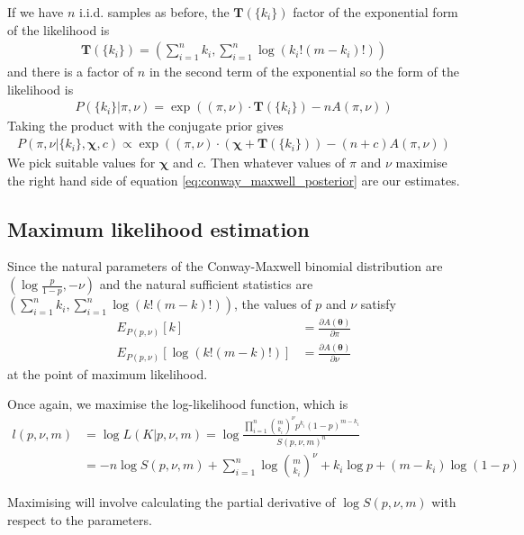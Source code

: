 \documentclass[a4paper,12pt]{article}
\theoremstyle{definition}
\newcommand{\pdiff}[2]{\frac{\partial #1}{\partial #2}} %
\begin{document}
If we have $n$ i.i.d. samples as before, the $\mathbf{T}(\lbrace k_i \rbrace)$ factor of the exponential form of the likelihood is 
\begin{align}
  \mathbf{T}(\lbrace k_i \rbrace) = \left( \sum_{i=1}^n k_i, \sum_{i=1}^n \log (k_i!(m - k_i)!) \right)
\end{align}
and there is a factor of $n$ in the second term of the exponential so the form of the likelihood is
\begin{align}
  P(\lbrace k_i \rbrace | \pi, \nu) = \exp \left( (\pi, \nu) \cdot \mathbf{T}(\lbrace k_i \rbrace) - nA (\pi, \nu)  \right)
\end{align}
Taking the product with the conjugate prior gives
\begin{align}\label{eq:conway_maxwell_posterior}
  P(\pi, \nu | \lbrace k_i \rbrace, \boldsymbol{\chi}, c) \propto \exp \left( (\pi, \nu) \cdot ( \boldsymbol{\chi} + \mathbf{T}(\lbrace k_i \rbrace)) - (n + c) A(\pi, \nu) \right)
\end{align}
We pick suitable values for $\boldsymbol{\chi}$ and $c$. Then whatever values of $\pi$ and $\nu$ maximise the right hand side of equation \ref{eq:conway_maxwell_posterior} are our estimates.

\subsection{Maximum likelihood estimation}
Since the natural parameters of the Conway-Maxwell binomial distribution are $\left( \log \frac{p}{1-p}, -\nu \right)$ and the natural sufficient statistics are $\left( \sum_{i=1}^n k_i, \sum_{i=1}^n \log (k! (m-k)!) \right)$, the values of $p$ and $\nu$ satisfy 
\begin{align}
  E_{P(p,\nu)}[k] & = \pdiff{A(\boldsymbol{\theta})}{\pi} \\
  E_{P(p, \nu)}[\log (k!(m-k)!)] & = \pdiff{A(\boldsymbol{\theta})}{\nu}
\end{align}
at the point of maximum likelihood.

Once again, we maximise the log-likelihood function, which is
\begin{align}
  l(p, \nu, m) &= \log L(K | p, \nu, m) = \log \frac{\prod_{i=1}^{n} \binom{m}{k_i}^{\nu} p^{k_i} (1-p)^{m-k_i}}{S(p, \nu, m)^n} \\
  &= - n \log S(p, \nu, m) + \sum_{i=1}^{n} \log \binom{m}{k_i}^{\nu} + k_i \log p + (m - k_i) \log (1-p)
\end{align}

Maximising will involve calculating the partial derivative of $\log S(p, \nu, m)$ with respect to the parameters. 
\end{document}
